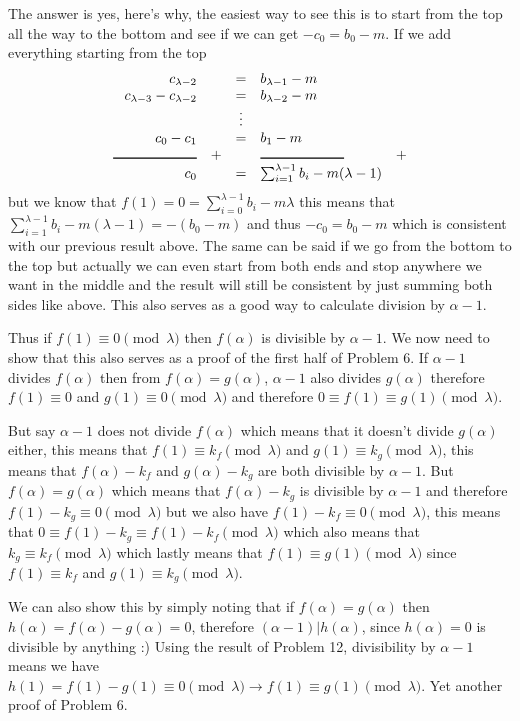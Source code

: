 \documentclass[aps,preprint,preprintnumbers,nofootinbib,showpacs,prd]{revtex4-1}
\newcommand{\nbea}{\begin{eqnarray*}}
\newcommand{\neea}{\end{eqnarray*}}
\begin{document}
The answer is yes, here's why, the easiest way to see this is to start from the top all the way to the bottom and see if we can get $-c_0 = b_0 - m$. If we add everything starting from the top
%
\nbea
\begin{array}{r c c l c}
c_{\lambda - 2} & ~ & = & b_{\lambda - 1} - m & ~ \\
c_{\lambda - 3} - c_{\lambda - 2} & ~ & = & b_{\lambda-2} - m  & ~ \\
& ~ & \vdots & \\
c_0 - c_1 & ~ & = & b_1 - m  & ~ \\
\rule[0pt]{60pt}{1pt} & + & & \rule[0pt]{60pt}{1pt} & + \\
c_0 & & = & \sum_{i = 1}^{\lambda - 1} b_i - m(\lambda - 1) &
\end{array}
\neea
%
but we know that $f(1) = 0 = \sum_{i = 0}^{\lambda - 1} b_i - m\lambda$ this means that $\sum_{i = 1}^{\lambda - 1} b_i - m(\lambda - 1) = -(b_0 - m)$ and thus $-c_0 = b_0 - m$ which is consistent with our previous result above. The same can be said if we go from the bottom to the top but actually we can even start from both ends and stop anywhere we want in the middle and the result will still be consistent by just summing both sides like above. This also serves as a good way to calculate division by $\alpha - 1$.

Thus if $f(1) \equiv 0 \pmod{\lambda}$ then $f(\alpha)$ is divisible by $\alpha - 1$. We now need to show that this also serves as a proof of the first half of Problem 6. If $\alpha - 1$ divides $f(\alpha)$ then from $f(\alpha) = g(\alpha)$, $\alpha - 1$ also divides $g(\alpha)$ therefore $f(1) \equiv 0$ and $g(1) \equiv 0 \pmod{\lambda}$ and therefore $0 \equiv f(1) \equiv g(1) \pmod{\lambda}$. 

But say $\alpha - 1$ does not divide $f(\alpha)$ which means that it doesn't divide $g(\alpha)$ either, this means that $f(1) \equiv k_f \pmod{\lambda}$ and $g(1) \equiv k_g \pmod{\lambda}$, this means that $f(\alpha) - k_f$ and $g(\alpha) - k_g$ are both divisible by $\alpha - 1$. But $f(\alpha) = g(\alpha)$ which means that $f(\alpha) - k_g$ is divisible by $\alpha - 1$ and therefore $f(1) - k_g \equiv 0 \pmod{\lambda}$ but we also have $f(1) - k_f \equiv 0 \pmod{\lambda}$, this means that $0 \equiv f(1) - k_g \equiv f(1) - k_f \pmod{\lambda}$ which also means that $k_g \equiv k_f \pmod{\lambda}$ which lastly means that $f(1) \equiv g(1) \pmod{\lambda}$ since $f(1) \equiv k_f$ and $g(1) \equiv k_g \pmod{\lambda}$.

We can also show this by simply noting that if $f(\alpha) = g(\alpha)$ then $h(\alpha) = f(\alpha) - g(\alpha) = 0$, therefore $(\alpha - 1)|h(\alpha)$, since $h(\alpha) = 0$ is divisible by anything :) Using the result of Problem 12, divisibility by $\alpha - 1$ means we have $h(1) = f(1) - g(1) \equiv 0 \pmod{\lambda} \to f(1) \equiv g(1) \pmod{\lambda}$. Yet another proof of Problem 6.
\end{document}
